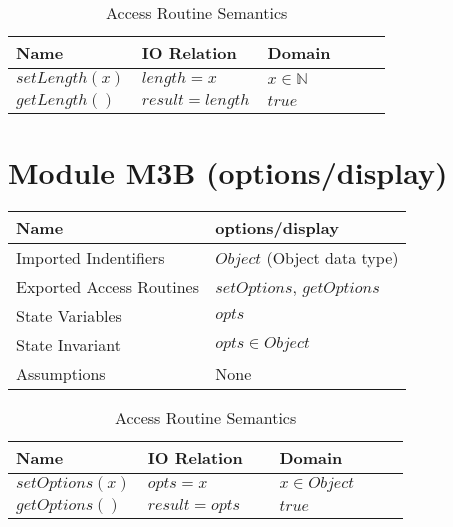 \documentclass[12pt]{article}
\newcommand{\N}{\mathbb{N}}
\begin{document}
\begin{table}[!htbp]
\caption{Access Routine Semantics}
\begin{tabular}{|p{0.33\linewidth} | p{0.33\linewidth}|p{0.33\linewidth}|}
\hline
Name & IO Relation & Domain \\
\hline
$setLength(x)$ & $length = x$ & $x \in \N$ \\
\hline
$getLength()$ & $result = length$ & $true$ \\
\hline
\end{tabular}
\end{table}


\newpage
\section{Module M3B (options/display)}

\begin{table}[!htbp]
\begin{tabular}{|p{0.5\linewidth} | p{0.5\linewidth}|}
\hline
Name & options/display \\
\hline
Imported Indentifiers & $Object$ (Object data type) \\
\hline
Exported Access Routines & $setOptions$, $getOptions$ \\
\hline
State Variables & $opts$ \\
\hline
State Invariant & $opts \in Object$ \\
\hline
Assumptions & None \\
\hline
\end{tabular}
\end{table}

\begin{table}[!htbp]
\caption{Access Routine Semantics}
\begin{tabular}{|p{0.33\linewidth} | p{0.33\linewidth}|p{0.33\linewidth}|}
\hline
Name & IO Relation & Domain \\
\hline
$setOptions(x)$ & $opts= x$ & $x \in Object$ \\
\hline
$getOptions()$ & $result = opts$ & $true$ \\
\hline
\end{tabular}
\end{table}
\end{document}
